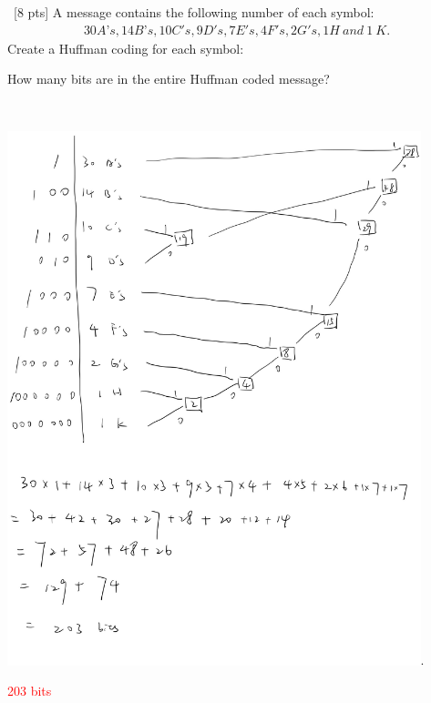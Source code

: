 \documentclass[12pt]{article}
\newenvironment{sol}[1][Solution]{\begin{trivlist}\item[\hskip\labelsep {\bfseries #1:}]}{\end{trivlist}}
\begin{document}
\begin{enumerate}
    \item \ [8 pts] A message contains the following number of each symbol:\\
    \begin{align*}
            30 A’s, 14 B’s, 10 C's, 9 D's, 7 E's, 4 F's, 2 G's, 1 H \ and \ 1 \ K.
    \end{align*}
    Create a Huffman coding for each symbol:

    How many bits are in the entire Huffman coded message?
            \begin{sol}
        \hspace*{\fill}\\
        \begin{center}
        \includegraphics[width=0.9\textwidth]{p3.jpg}.
    \end{center}
        \textcolor{red}{203 bits}
        \end{sol}


\end{enumerate}
\end{document}
